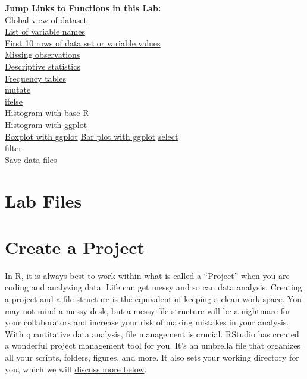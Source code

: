 \documentclass[
]{book}
\begin{document}
\textbf{Jump Links to Functions in this Lab:}\\
\protect\hyperlink{global}{Global view of dataset}\\
\protect\hyperlink{names}{List of variable names}\\
\protect\hyperlink{head}{First 10 rows of data set or variable values}\\
\protect\hyperlink{missing}{Missing observations}\\
\protect\hyperlink{descriptive}{Descriptive statistics}\\
\protect\hyperlink{frequency}{Frequency tables}\\
\protect\hyperlink{mutate}{mutate}\\
\protect\hyperlink{ifelse}{ifelse}\\
\protect\hyperlink{hist}{Histogram with base R}\\
\protect\hyperlink{histgg}{Histogram with ggplot}\\
\protect\hyperlink{boxplot}{Boxplot with ggplot}
\protect\hyperlink{barplot}{Bar plot with ggplot}
\protect\hyperlink{select}{select}\\
\protect\hyperlink{filter}{filter}\\
\protect\hyperlink{save}{Save data files}

\hypertarget{lab-files-1}{%
\section{Lab Files}\label{lab-files-1}}

\hypertarget{project}{%
\section{Create a Project}\label{project}}

In R, it is always best to work within what is called a ``Project'' when you are coding and analyzing data. Life can get messy and so can data analysis. Creating a project and a file structure is the equivalent of keeping a clean work space. You may not mind a messy desk, but a messy file structure will be a nightmare for your collaborators and increase your risk of making mistakes in your analysis. With quantitative data analysis, file management is crucial.
RStudio has created a wonderful project management tool for you. It's an umbrella file that organizes all your scripts, folders, figures, and more. It also sets your working directory for you, which we will \protect\hyperlink{environment}{discuss more below}.
\end{document}
